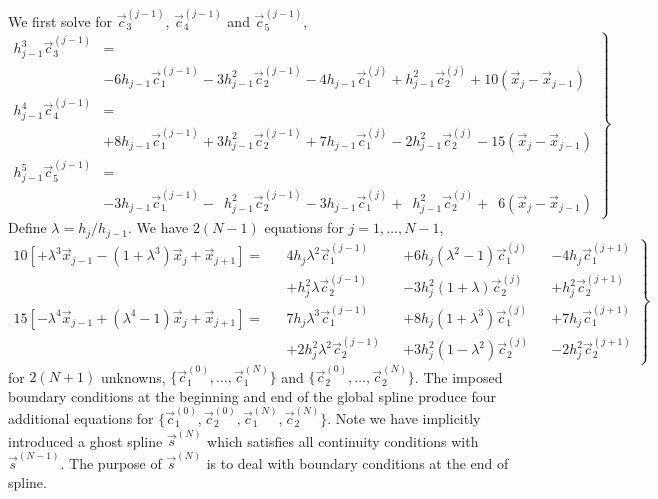 \documentclass{jfm}
\begin{document}
We first solve for $\vec{c}^{(j-1)}_3$, $\vec{c}^{(j-1)}_4$ and $\vec{c}^{(j-1)}_5$,
\begin{equation}\label{eq:spline_c3c4c5}\left.
\begin{aligned}
h^3_{j-1}\vec{c}^{(j-1)}_3&=\\
&-6 h_{j-1} \vec{c}_1^{(j-1)}
-3 h_{j-1}^2 \vec{c}_2^{(j-1)}
-4 h_{j-1} \vec{c}_1^{(j)}
+h_{j-1}^2 \vec{c}_2^{(j)}
+10( \vec{x}_j- \vec{x}_{j-1})\\
h^4_{j-1}\vec{c}^{(j-1)}_4&=\\
&+8 h_{j-1} \vec{c}_1^{(j-1)}
+3 h_{j-1}^2 \vec{c}_2^{(j-1)}
+7 h_{j-1} \vec{c}_1^{(j)}
-2 h_{j-1}^2 \vec{c}_2^{(j)}
-15 (\vec{x}_j- \vec{x}_{j-1})\\
h^5_{j-1}\vec{c}^{(j-1)}_5&=\\
&-3 h_{j-1} \vec{c}_1^{(j-1)}
-\phantom{1}h_{j-1}^2 \vec{c}_2^{(j-1)}
-3 h_{j-1} \vec{c}_1^{(j)}
+\phantom{1}h_{j-1}^2 \vec{c}_2^{(j)}
+\phantom{1}6( \vec{x}_j- \vec{x}_{j-1})
\end{aligned}\right\}
\end{equation}
Define $\lambda=h_j/h_{j-1}$. We have $2(N-1)$ equations for $j=1,\dots, N-1$,
\begin{equation}\label{eq:spline_mid}
\left.\begin{aligned}
10\left[+ \lambda^3 \vec{x}_{j-1}- (1+\lambda^3) \vec{x}_j+\vec{x}_{j+1}\right]=
&&4 h_{j} \lambda^2 \vec{c}_1^{(j-1)}
&&+6 h_{j} (\lambda^2-1) \vec{c}_1^{(j)}
&&-4 h_{j} \vec{c}_1^{(j+1)}\\
&&+h_{j}^2 \lambda \vec{c}_2^{(j-1)}
&&-3 h_{j}^2 (1+\lambda) \vec{c}_2^{(j)}
&&+h_{j}^2 \vec{c}_2^{(j+1)}
\\
15 \left[- \lambda^4 \vec{x}_{j-1}+ (\lambda^4-1) \vec{x}_j+\vec{x}_{j+1}\right]=
&&7 h_{j} \lambda^3 \vec{c}_1^{(j-1)}
&&+8 h_{j} (1+\lambda^3) \vec{c}_1^{(j)}
&&+7 h_{j} \vec{c}_1^{(j+1)}\\
&&+2 h_{j}^2 \lambda^2 \vec{c}_2^{(j-1)}
&&+3h_{j}^2 (1- \lambda^2) \vec{c}_2^{(j)}
&&-2 h_{j}^2 \vec{c}_2^{(j+1)}
\end{aligned}\right\}
\end{equation}
for $2(N+1)$ unknowns,
 $\{\vec{c}_1^{(0)},\dots,\vec{c}_1^{(N)}\}$ and  $\{\vec{c}_2^{(0)},\dots,\vec{c}_2^{(N)}\}$.
The imposed boundary conditions at the beginning and end of the global spline
produce four additional equations for
$\{\vec{c}_1^{(0)}, \vec{c}_2^{(0)},\vec{c}_1^{(N)}, \vec{c}_2^{(N)}\}$.
Note we have implicitly introduced a ghost spline $\vec{s}^{(N)}$
which satisfies all continuity conditions with $\vec{s}^{(N-1)}$.
The purpose of $\vec{s}^{(N)}$ is to deal with boundary conditions at the end of spline.
\end{document}
